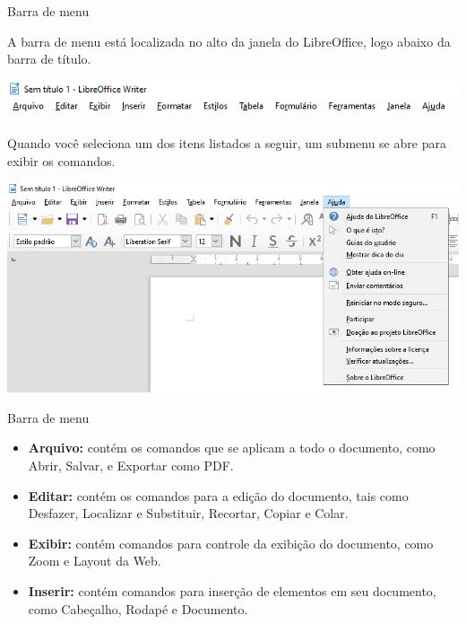 \begin{frame}{Barra de menu}
	\begin{block}{}
		A barra de menu está localizada no alto da janela do LibreOffice, logo abaixo da barra de título.
	\end{block}

	\centerline{\includegraphics[width=1\linewidth]{Figuras/Ch04/fig6.1}}

	\begin{block}{}
		Quando você seleciona um dos itens listados a seguir, um submenu se abre para exibir os comandos.
	\end{block}

	\centerline{\includegraphics[width=0.7\linewidth]{Figuras/Ch04/fig6}}
\end{frame}


\begin{frame}{Barra de menu}
	\begin{block}{}
		\begin{itemize}
			\item \textbf{Arquivo:} contém os comandos que se aplicam a todo o documento, como Abrir, Salvar, e Exportar como PDF.
			\item \textbf{Editar:} contém os comandos para a edição do documento, tais como Desfazer, Localizar e Substituir, Recortar, Copiar e Colar.
			\item \textbf{Exibir:} contém comandos para controle da exibição do documento, como Zoom e Layout da Web.
			\item \textbf{Inserir:} contém comandos para inserção de elementos em seu documento, como Cabeçalho, Rodapé e Documento.
		\end{itemize}
	\end{block}
\end{frame}


